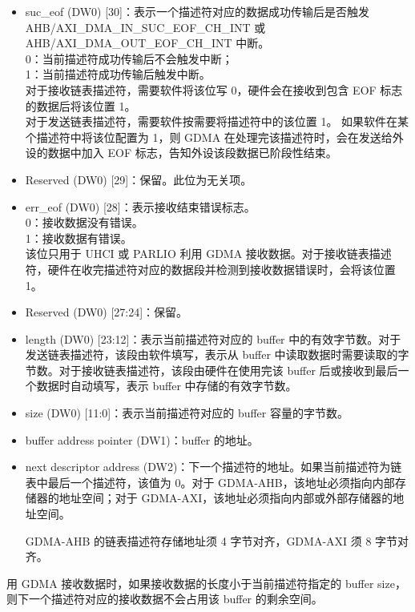 \documentclass[main\_\_CN.tex]{subfiles}
\begin{document}
\begin{itemize}
    {\bfseries 注意： } 本文以 AHB/AXI\_DMA\_OUT 开头的寄存器对应 TX 通道寄存器，以 AHB/AXI\_DMA\_IN 开头的寄存器对应 RX 通道寄存器。
    \item suc\_eof (DW0) [30]：表示一个描述符对应的数据成功传输后是否触发 AHB/AXI\_DMA\_IN\_SUC\_EOF\_CH\_INT 或 AHB/AXI\_DMA\_OUT\_EOF\_CH\_INT 中断。\\
    0：当前描述符成功传输后不会触发中断；\\
    1：当前描述符成功传输后触发中断。\\
    对于接收链表描述符，需要软件将该位写 0，硬件会在接收到包含 EOF 标志的数据后将该位置 1。\\对于发送链表描述符，需要软件按需要将描述符中的该位置 1。
    如果软件在某个描述符中将该位配置为 1，则 GDMA 在处理完该描述符时，会在发送给外设的数据中加入 EOF 标志，告知外设该段数据已阶段性结束。
    \item Reserved (DW0) [29]：保留。此位为无关项。
    \item err\_eof (DW0) [28]：表示接收结束错误标志。\\
    0：接收数据没有错误。\\
    1：接收数据有错误。\\
    该位只用于 UHCI 或 PARLIO 利用 GDMA 接收数据。对于接收链表描述符，硬件在收完描述符对应的数据段并检测到接收数据错误时，会将该位置 1。
    \item Reserved (DW0) [27:24]：保留。
    \item length (DW0) [23:12]：表示当前描述符对应的 buffer 中的有效字节数。对于发送链表描述符，该段由软件填写，表示从 buffer 中读取数据时需要读取的字节数。对于接收链表描述符，该段由硬件在使用完该 buffer 后或接收到最后一个数据时自动填写，表示 buffer 中存储的有效字节数。
    \item size (DW0) [11:0]：表示当前描述符对应的 buffer 容量的字节数。
    \item buffer address pointer (DW1)：buffer 的地址。
    \item next descriptor address (DW2)：下一个描述符的地址。如果当前描述符为链表中最后一个描述符，该值为 0。对于 GDMA-AHB，该地址必须指向内部存储器的地址空间；对于 GDMA-AXI，该地址必须指向内部或外部存储器的地址空间。
    \begin{tiplisting}
        GDMA-AHB 的链表描述符存储地址须 4 字节对齐，GDMA-AXI 须 8 字节对齐。
    \end{tiplisting}
\end{itemize}


用 GDMA 接收数据时，如果接收数据的长度小于当前描述符指定的 buffer size，则下一个描述符对应的接收数据不会占用该 buffer 的剩余空间。
\end{document}
